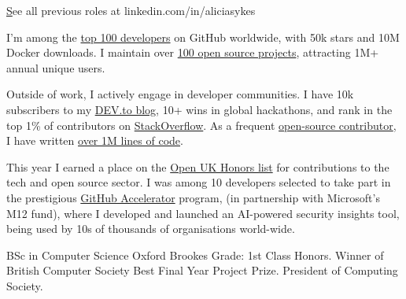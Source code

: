 \documentclass[]{resume-format}
\begin{document}
    \vspace{-5mm}
    \begin{flushright}
        \small\color{lightgray} \href{ https://linkedin.com/in/aliciasykes }See all previous roles at linkedin.com/in/aliciasykes
    \end{flushright}




\begin{cvachievements}
    \item { I'm among the \href{https://gitstar-ranking.com/Lissy93}{top 100 developers} on GitHub worldwide, with 50k stars and 10M Docker downloads. I maintain over \href{https://apps.aliciasykes.com/}{100 open source projects}, attracting 1M+ annual unique users. }
    \item { Outside of work, I actively engage in developer communities. I have 10k subscribers to my \href{https://dev.to/lissy93}{DEV.to blog}, 10+ wins in global hackathons, and rank in the top 1\% of contributors on \href{https://stackoverflow.com/users/979052/alicia-sykes}{StackOverflow}. As a frequent \href{https://github.com/lissy93}{open-source contributor}, I have written \href{https://codestats.net/users/alicia}{over 1M lines of code}. }
    \item { This year I earned a place on the \href{https://openuk.uk/community/openuk-honours-lists/2024-honours-list/}{Open UK Honors list} for contributions to the tech and open source sector. I was among 10 developers selected to take part in the prestigious \href{https://github.blog/news-insights/company-news/2024-github-accelerator-meet-the-11-projects-shaping-open-source-ai/#web-check-bringing-security-to-the-web}{GitHub Accelerator} program, (in partnership with Microsoft's M12 fund), where I developed and launched an AI-powered security insights tool, being used by 10s of thousands of organisations world-wide. }
\end{cvachievements}



\begin{cventries}
    \cventry
    { BSc in Computer Science }
    { Oxford Brookes }
    {}
    {}
    {Grade: 1st Class Honors. Winner of British Computer Society Best Final Year Project Prize. President of Computing Society.}
\end{cventries}
\end{document}
